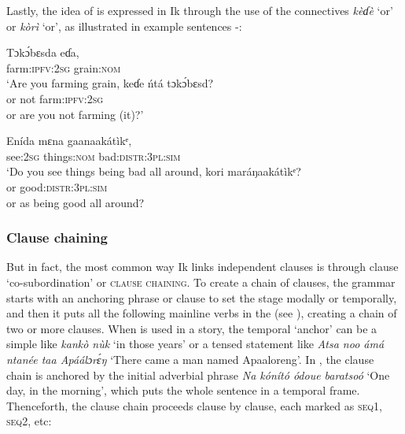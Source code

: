 Lastly, the idea of  is expressed in Ik through the use of the connectives \textit{kèɗè} ‘or’ or \textit{kòrì} ‘or’, as illustrated in example sentences -:



\ea\label{ex:syn:66}
  \ea
  \gll Tɔk\'{ɔ}bɛs{\Í}da       eɗa,  \\
farm:\textsc{ipfv:2sg}   grain:\textsc{nom}    \\
  \glt ‘Are you farming grain, 
  \medskip
  \ex
  \gll keɗe   ńtá   tɔk\'{ɔ}bɛs{\Î}d\ᶤ? \\
or   not   farm:\textsc{ipfv:2sg}    \\
  \glt or are you not farming (it)?’
  \z  
\z


\ea\label{ex:syn:67}
  \ea
  \gll Enída       mɛna     gaanaakátìkᵉ, \\
see:\textsc{2sg}   things:\textsc{nom}   bad:\textsc{distr:3pl:sim}    \\
  \glt ‘Do you see things being bad all around, 
  \medskip
  \ex
  \gll kori   maráŋaakátìkᵉ? \\
or   good:\textsc{distr:3pl:sim}    \\
  \glt or as being good all around?
  \z  
\z


\subsubsection{Clause chaining}\label{sec:10.8.2}

But in fact, the most common way Ik links independent clauses is through clause ‘co-subordination’ or \textsc{clause chaining}. To create a chain of clauses, the grammar starts with an anchoring phrase or clause to set the stage modally or temporally, and then it puts all the following mainline verbs in the  (see ), creating a chain of two or more clauses. When  is used in a story, the temporal ‘anchor’ can be a simple  like \textit{ka{\Í}n{\Í}kò nùk\ᵘ} ‘in those years’ or a tensed statement like \textit{Atsa noo ámá ntanée taa Apáálɔr\'{ɛ}ŋ} ‘There came a man named Apaaloreng’. In , the clause chain is anchored by the initial adverbial phrase \textit{Na kónít}\textit{ó ódoue baratsoó} ‘One day, in the morning’, which puts the whole sentence in a temporal frame. Thenceforth, the clause chain proceeds clause by clause, each marked as \textsc{seq1}, \textsc{seq2}, etc:




